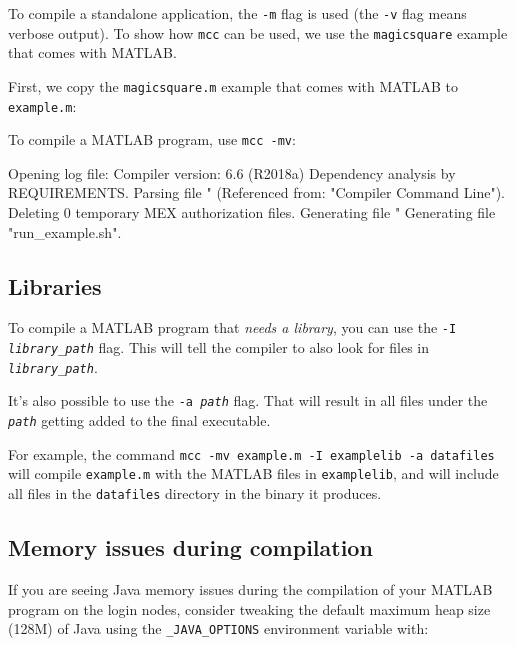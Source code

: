 To compile a standalone application, the \lstinline|-m|
flag is used (the \lstinline|-v| flag means verbose output).
To show how \lstinline|mcc| can be used, we use the \lstinline|magicsquare| example
that comes with MATLAB.

First, we copy the \lstinline|magicsquare.m| example that comes with MATLAB to \lstinline|example.m|:

\begin{prompt}
\end{prompt}

To compile a MATLAB program, use \lstinline|mcc -mv|:

\begin{prompt}
Opening log file:  %
Compiler version: 6.6 (R2018a)
Dependency analysis by REQUIREMENTS.
Parsing file "%
	(Referenced from: "Compiler Command Line").
Deleting 0 temporary MEX authorization files.
Generating file "%
Generating file "run\_example.sh".
\end{prompt}

\subsection{Libraries}

To compile a MATLAB program that \emph{needs a library}, you can use the
\texttt{-I \emph{library\_path}} flag. This will tell the compiler to also
look for files in \texttt{\emph{library\_path}}.

It's also possible to use the \texttt{-a \emph{path}} flag. That will result in
all files under the \texttt{\emph{path}} getting added to the final executable.

For example, the command \lstinline|mcc -mv example.m -I examplelib -a datafiles| will
compile \lstinline|example.m| with the MATLAB files in \lstinline|examplelib|, and will
include all files in the \lstinline|datafiles| directory in the binary it produces.

\subsection{Memory issues during compilation}

If you are seeing Java memory issues during the compilation of your MATLAB program
on the login nodes, consider tweaking the default maximum heap size (128M) of Java
using the \lstinline|_JAVA_OPTIONS| environment variable with:


